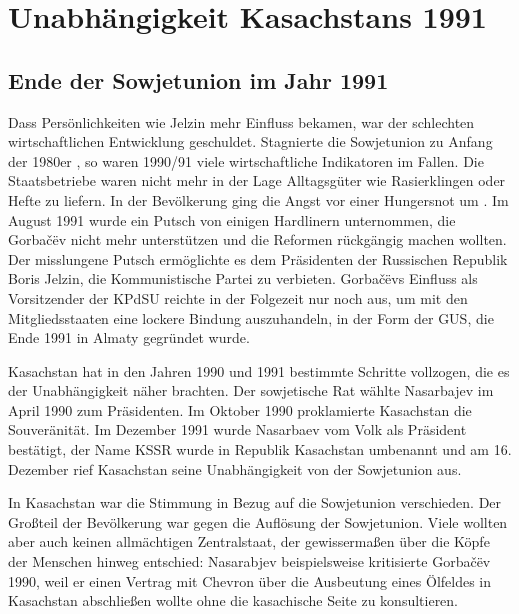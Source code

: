 \documentclass[12pt,headsepline,a4paper]{scrartcl}
\begin{document}
\section{Unabhängigkeit Kasachstans 1991}
\subsection{Ende der Sowjetunion im Jahr 1991}
Dass Persönlichkeiten wie Jelzin mehr Einfluss bekamen, war der schlechten
wirtschaftlichen Entwicklung geschuldet. Stagnierte die Sowjetunion zu Anfang der 1980er
, so waren 1990/91 viele wirtschaftliche Indikatoren im Fallen. Die
Staatsbetriebe waren nicht mehr in der Lage Alltagsgüter wie Rasierklingen oder Hefte
zu liefern. In der Bevölkerung ging die Angst vor einer Hungersnot um \autocite[130]{neef2007}. Im August
1991 wurde ein Putsch von einigen Hardlinern unternommen, die Gorbačëv nicht mehr
unterstützen und die Reformen rückgängig machen wollten. Der misslungene Putsch
ermöglichte es dem Präsidenten der Russischen Republik Boris Jelzin, die
Kommunistische Partei zu verbieten. Gorbačëvs Einfluss als Vorsitzender der KPdSU
reichte in der Folgezeit nur noch aus, um mit den Mitgliedsstaaten eine lockere Bindung
auszuhandeln, in der Form der GUS, die Ende 1991 in Almaty gegründet wurde.

Kasachstan hat in den Jahren 1990 und 1991 bestimmte Schritte vollzogen, die es der
Unabhängigkeit näher brachten. Der sowjetische Rat wählte Nasarbajev im April 1990
zum Präsidenten. Im Oktober 1990 proklamierte Kasachstan die Souveränität. Im
Dezember 1991 wurde Nasarbaev vom Volk als Präsident bestätigt, der Name KSSR
wurde in Republik Kasachstan umbenannt und am 16. Dezember rief Kasachstan seine
Unabhängigkeit von der Sowjetunion aus.

In Kasachstan war die Stimmung in Bezug auf die Sowjetunion verschieden. Der
Großteil der Bevölkerung war gegen die Auflösung der Sowjetunion. Viele wollten aber
auch keinen allmächtigen Zentralstaat, der gewissermaßen über die Köpfe der
Menschen hinweg entschied: Nasarabjev beispielsweise kritisierte Gorbačëv 1990, weil
er einen Vertrag mit Chevron über die Ausbeutung eines Ölfeldes in Kasachstan
abschließen wollte ohne die kasachische Seite zu konsultieren.
\end{document}
